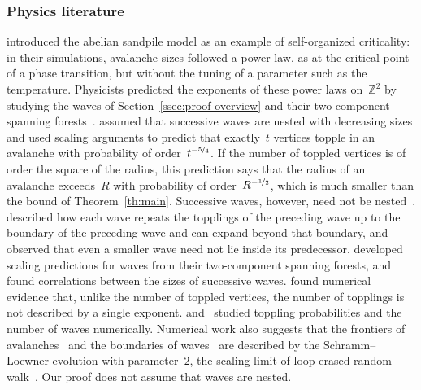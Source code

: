 \documentclass[11pt]{amsart}
\numberwithin{equation}{section}
\newcommand{\Z}{\mathbb Z}
\newcommand{\nf}{\nicefrac}
\begin{document}
\subsubsection{Physics literature}
\citet*{BakTangWiesenfeld1987} introduced the abelian sandpile model as an example of self-organized criticality: in their simulations, avalanche sizes followed a power law, as at the critical point of a phase transition, but without the tuning of a parameter such as the temperature. Physicists predicted the exponents of these power laws on~$\Z^2$ by studying the waves of Section~\ref{ssec:proof-overview} and their two-component spanning forests~\citep{IvashkevichKtitarevPriezzhev1994}. \citet*{PriezzhevKtitarevIvashkevich1996} assumed that successive waves are nested with decreasing sizes and used scaling arguments to predict that exactly~$t$ vertices topple in an avalanche with probability of order~$t^{-\nf54}$. If the number of toppled vertices is of order the square of the radius, this prediction says that the radius of an avalanche exceeds~$R$ with probability of order~$R^{-\nf12}$, which is much smaller than the bound of Theorem~\ref{th:main}. Successive waves, however, need not be nested~\citep{DharManna1994}. \citet*{PaczuskiBoettcher1997} described how each wave repeats the topplings of the preceding wave up to the boundary of the preceding wave and can expand beyond that boundary, and~\citet*{KtitarevPriezzhev1998} observed that even a smaller wave need not lie inside its predecessor. \citet*{KtitarevLubeckGrassbergerPriezzhev2000} developed scaling predictions for waves from their two-component spanning forests, and~\citet*{DeMenechStella2000} found correlations between the sizes of successive waves. \citet*{TebaldiDeMenechStella1999} found numerical evidence that, unlike the number of toppled vertices, the number of topplings is not described by a single exponent. \citet*{JaraiSun2019} and~\citet{Sun2022} studied toppling probabilities and the number of waves numerically. Numerical work also suggests that the frontiers of avalanches~\citep*{Saberi2009} and the boundaries of waves~\citep*{AzimiTafreshi2010,DashtiNaserabadi2012} are described by the Schramm--Loewner evolution with parameter~$2$, the scaling limit of loop-erased random walk~\citep*{LawlerSchrammWerner2004}. Our proof does not assume that waves are nested.
\end{document}
